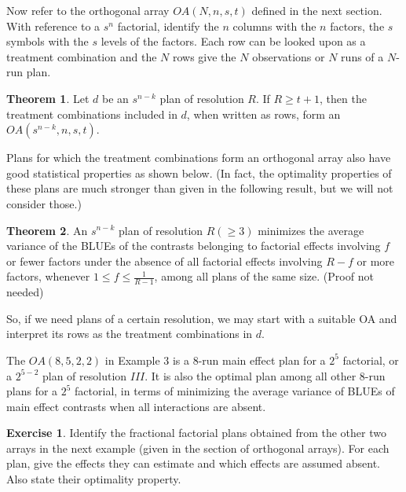 \documentclass[12pt]{article}
\theoremstyle{definition}
\newtheorem{thm}{Theorem}
\newtheorem{ex}{Exercise}
\newenvironment{theorem}{
\begin{tcolorbox}[colback=green!5!white,colframe=green!75!black, parbox = false]\begin{thm} }{\end{thm}\end{tcolorbox} }
\newenvironment{example}[1][\unskip]{
\begin{tcolorbox}[colback=blue!5!white,colframe=blue!75!black, title = {Example #1}, parbox = false] }{\end{tcolorbox} }
\newenvironment{exercise}{
\begin{tcolorbox}[colback=red!5!white,colframe=red!75!black, parbox = false]\begin{ex} }{\end{ex}\end{tcolorbox} }
\begin{document}
Now refer to the orthogonal array $OA(N,n,s,t)$ defined in the next section. With reference to a $s^n$ factorial, identify the $n$ columns with the $n$ factors, the $s$ symbols with the $s$ levels of the factors. Each row can be looked upon as a treatment combination and the $N$ rows give the $N$ observations or $N$ runs of a $N$-run plan. 

\begin{theorem}
    Let $d$ be an $s^{n-k}$ plan of resolution $R$. If $R \geq t +1$,
	then the treatment combinations included in $d$, when written as rows, form
	an  $OA(s^{n-k}, n, s, t).$ 
	\label{thm:class-6-res-1}
\end{theorem}

Plans for which the treatment combinations form an orthogonal array also have good statistical properties as shown below.  (In fact, the optimality properties of these plans are much stronger than given in the following result, but we will not consider those.)

\begin{theorem}
    An $s^{n-k}$ plan of 
	resolution $R (\geq 3)$ minimizes the average variance of the BLUEs of the contrasts belonging to factorial effects involving $f$ or fewer factors under the absence of all factorial effects involving $R-f$ or more factors, whenever $1\leq f \leq \frac{1}{R-1}$, among all plans of the same size. (Proof not needed)
	\label{thm:class-6-res-2}
\end{theorem}

So, if we need plans of a certain resolution, we may start with a suitable OA and interpret its rows as the treatment combinations in $d$.

\begin{example}
     The $OA(8,5,2,2)$ in Example 3 is a $8$-run main effect plan for a $2^5$ factorial, or a $2^{5-2}$ plan of resolution $III$. It is also the optimal plan among all other $8$-run  plans for a $2^5$ factorial, in terms of minimizing the average variance of BLUEs of main effect contrasts when all interactions are absent. 
\end{example}

\begin{exercise}
    Identify the fractional factorial plans obtained from the other two arrays in the next example (given in the section of orthogonal arrays). For each plan, give the effects they can estimate and which effects are assumed absent.  Also state their optimality property.
\end{exercise}
\end{document}
